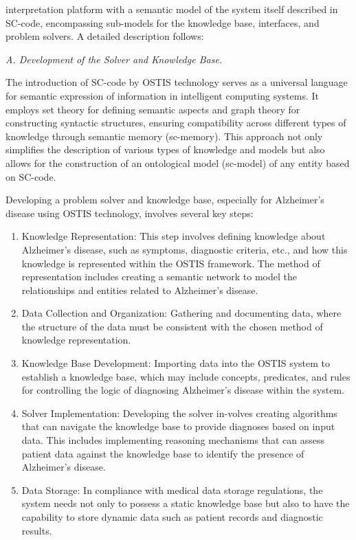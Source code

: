 \documentclass{scndocument}
\begin{document}
\begin{multicols*}{2}
\noindent interpretation platform with a semantic model of the system itself described in SC-code, encompassing sub-models for the knowledge base, interfaces, and problem solvers. A detailed description follows:
\vspace{5mm}

\noindent\textit{A. Development of the Solver and Knowledge Base.}
\vspace{3mm}

The introduction of SC-code by OSTIS technology serves as a universal language for semantic expression of information in intelligent computing systems. It employs set theory for defining semantic aspects and graph theory for constructing syntactic structures, ensuring compatibility across different types of knowledge through semantic memory (sc-memory). This approach not only simplifies the description of various types of knowledge and models but also allows for the construction of an ontological model (sc-model) of any entity based on SC-code.

Developing a problem solver and knowledge base, especially for Alzheimer’s disease using OSTIS technology, involves several key steps:
\begin{enumerate}[label=\alph*), noitemsep]
\item Knowledge Representation: This step involves defining knowledge about Alzheimer’s disease, such as symptoms, diagnostic criteria, etc., and how this knowledge is represented within the OSTIS framework. The method of representation includes creating a semantic network to model the relationships and entities related to Alzheimer’s disease.
\item Data Collection and Organization: Gathering and documenting data, where the structure of the data must be consistent with the chosen method of knowledge representation.
\item Knowledge Base Development: Importing data into the OSTIS system to establish a knowledge base, which may include concepts, predicates, and rules for controlling the logic of diagnosing Alzheimer’s disease within the system.
\item Solver Implementation: Developing the solver in-volves creating algorithms that can navigate the knowledge base to provide diagnoses based on input data. This includes implementing reasoning mechanisms that can assess patient data against the knowledge base to identify the presence of Alzheimer’s disease.
\item Data Storage: In compliance with medical data storage regulations, the system needs not only to possess a static knowledge base but also to have the capability to store dynamic data such as patient records and diagnostic results.
\end{enumerate}


\end{multicols*}
\end{document}

